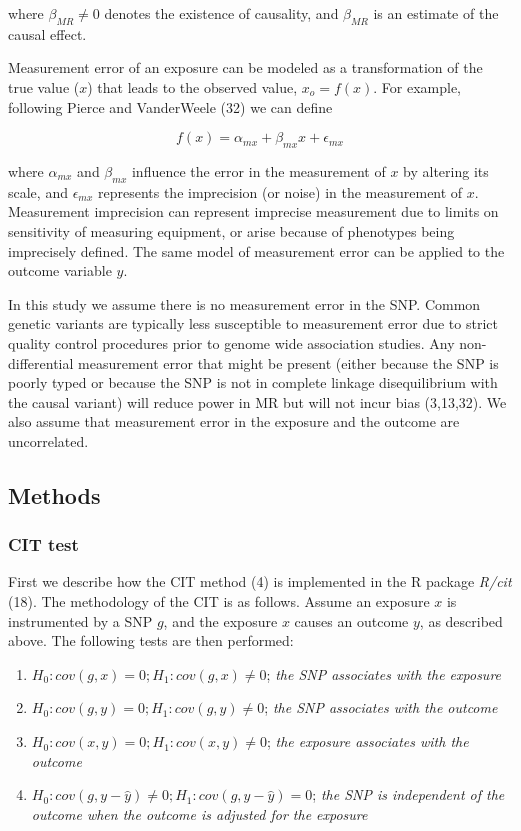 \documentclass[]{article}
\providecommand{\tightlist}{%
  \setlength{\itemsep}{0pt}\setlength{\parskip}{0pt}}
\begin{document}
where \(\beta_{MR} \neq 0\) denotes the existence of causality, and
\(\beta_{MR}\) is an estimate of the causal effect.

Measurement error of an exposure can be modeled as a transformation of
the true value (\(x\)) that leads to the observed value, \(x_o = f(x)\).
For example, following Pierce and VanderWeele (32) we can define

\[
f(x) = \alpha_{mx} + \beta_{mx} x + \epsilon_{mx}
\]

where \(\alpha_{mx}\) and \(\beta_{mx}\) influence the error in the
measurement of \(x\) by altering its scale, and \(\epsilon_{mx}\)
represents the imprecision (or noise) in the measurement of \(x\).
Measurement imprecision can represent imprecise measurement due to
limits on sensitivity of measuring equipment, or arise because of
phenotypes being imprecisely defined. The same model of measurement
error can be applied to the outcome variable \(y\).

In this study we assume there is no measurement error in the SNP. Common
genetic variants are typically less susceptible to measurement error due
to strict quality control procedures prior to genome wide association
studies. Any non-differential measurement error that might be present
(either because the SNP is poorly typed or because the SNP is not in
complete linkage disequilibrium with the causal variant) will reduce
power in MR but will not incur bias (3,13,32). We also assume that
measurement error in the exposure and the outcome are uncorrelated.

\subsection{Methods}\label{methods}

\subsubsection{CIT test}\label{cit-test}

First we describe how the CIT method (4) is implemented in the R package
\emph{R/cit} (18). The methodology of the CIT is as follows. Assume an
exposure \(x\) is instrumented by a SNP \(g\), and the exposure \(x\)
causes an outcome \(y\), as described above. The following tests are
then performed:

\begin{enumerate}
\def\labelenumi{\arabic{enumi}.}
\tightlist
\item
  \(H_0: cov(g, x) = 0; H_1: cov(g, x) \neq 0\); \emph{the SNP
  associates with the exposure}
\item
  \(H_0: cov(g, y) = 0; H_1: cov(g, y) \neq 0\); \emph{the SNP
  associates with the outcome}
\item
  \(H_0: cov(x, y) = 0; H_1: cov(x, y) \neq 0\); \emph{the exposure
  associates with the outcome}
\item
  \(H_0: cov(g, y - \hat{y}) \neq 0; H_1: cov(g, y - \hat{y}) = 0\);
  \emph{the SNP is independent of the outcome when the outcome is
  adjusted for the exposure}
\end{enumerate}
\end{document}
